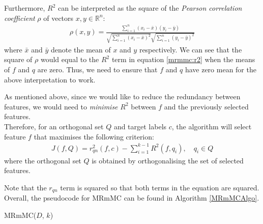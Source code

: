 \documentclass[12pt, twoside, a4paper]{report}
\begin{document}
Furthermore, $R^2$ can be interpreted as the square of the \textit{Pearson correlation coefficient} $\rho$ of vectors $x,y \in \mathbb{R}^n$:
\begin{align*}
\rho(x, y) = \frac{\sum_{i=1}^n (x_i - \bar{x})(y_i - \bar{y})}{\sqrt{\sum_{i=1}^n (x_i-\bar{x})^2}\sqrt{\sum_{i=1}^n (y_i-\bar{y})^2}}
\end{align*}
where $\bar{x}$ and $\bar{y}$ denote the mean of $x$ and $y$ respectively. We can see that the square of $\rho$ would equal to the $R^2$ term in equation \ref{mrmmc:r2} when the means of $f$ and $q$ are zero. Thus, we need to ensure that $f$ and $q$ have zero mean for the above interpretation to work.

As mentioned above, since we would like to reduce the redundancy between features, we would need to \textit{minimise} $R^2$ between $f$ and the previously selected features.\\

Therefore, for an orthogonal set $Q$ and target labels $c$, the algorithm will select feature $f$ that maximises the following criterion:
\begin{align*}
J(f, Q) = r_{qn}^2(f, c)- \sum_{i=1}^{k-1} R^2(f, q_i), \quad q_i \in Q
\end{align*}
where the orthogonal set $Q$ is obtained by orthogonalising the set of selected features.

Note that the $r_{qn}$ term is squared so that both terms in the equation are squared. Overall, the pseudocode for MRmMC can be found in Algorithm \ref{MRmMCAlgo}.

\begin{algorithm}
\DontPrintSemicolon
{}
\BlankLine
{}
\caption{MRmMC($D$, $k$) \label{MRmMCAlgo}}
\end{algorithm}
\end{document}
